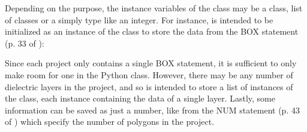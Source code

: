 \documentclass[letterpaper,10pt,english,openany]{sphinxmanual}
\begin{document}
%
\begin{sphinxVerbatim}[commandchars=\\\{\}]
 
     
          
          
          
          
          \PYG{p}{[}\PYG{p}{]}
          \PYG{p}{[}\PYG{p}{]}
          
          
\end{sphinxVerbatim}

Depending on the purpose, the instance variables of the  class may be a class, list of classes or a simply type like an integer. For instance,  is intended to be initialized as an instance of the  class to store the data from the BOX statement (p. 33 of \label{\detokenize{source/dev_guide:id3}}{\hyperref[\detokenize{source/users_guide:son15}]{\sphinxcrossref{{[}Son15{]}}}}):

%
\begin{sphinxVerbatim}[commandchars=\\\{\}]
 
     
          
          
          
          
          
          
          
\end{sphinxVerbatim}

Since each project only contains a single BOX statement, it is sufficient to only make room for one in the Python class. However, there may be any number of dielectric layers in the project, and so  is intended to store a list of instances of the  class, each instance containing the data of a single layer. Lastly, some information can be saved as just a number, like  from the NUM statement (p. 43 of \label{\detokenize{source/dev_guide:id4}}{\hyperref[\detokenize{source/users_guide:son15}]{\sphinxcrossref{{[}Son15{]}}}}) which specify the number of polygons in the project.
\end{document}
